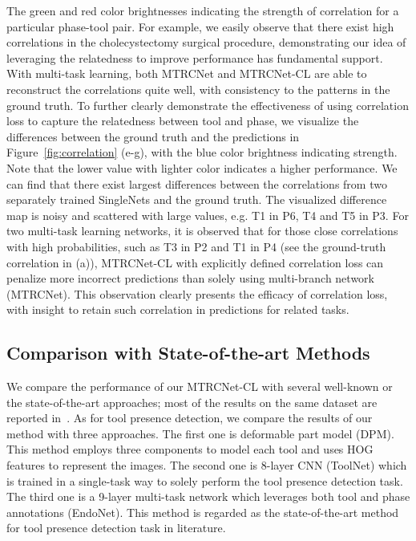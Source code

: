 \documentclass{elsarticle}
\begin{document}
The green and red color brightnesses indicating the strength of correlation for a particular phase-tool pair.
For example, we easily observe that there exist high correlations in the cholecystectomy surgical procedure, demonstrating our idea of leveraging the relatedness to improve performance has fundamental support.
With multi-task learning, both MTRCNet and MTRCNet-CL are able to reconstruct the correlations quite well, with consistency to the patterns in the ground truth.
To further clearly demonstrate the effectiveness of using correlation loss to capture the relatedness between tool and phase,
we visualize the differences between the ground truth and the predictions in Figure~\ref{fig:correlation} (e-g), with the blue color brightness indicating strength.
Note that the lower value with lighter color indicates a higher performance.
We can find that there exist largest differences between the correlations from two separately trained SingleNets and the ground truth.
The visualized difference map is noisy and scattered with large values, e.g. T1 in P6, T4 and T5 in P3.
For two multi-task learning networks, it is observed that for those close correlations with high probabilities, such as T3 in P2 and T1 in P4 (see the ground-truth correlation in (a)), MTRCNet-CL with explicitly defined correlation loss can penalize more incorrect predictions than solely using multi-branch network (MTRCNet).
This observation clearly presents the efficacy of correlation loss, with insight to retain such correlation in predictions for related tasks.



\subsection{Comparison with State-of-the-art Methods}

We compare the performance of our MTRCNet-CL with several well-known or the state-of-the-art approaches; most of the results on the same dataset are reported in~\cite{twinanda2017endonet}.
As for tool presence detection, we compare the results of our method with three approaches.
The first one is deformable part model (DPM). This method employs three components to model each tool and uses HOG features to represent the images.
The second one is 8-layer CNN (ToolNet) which is trained in a single-task way to solely perform the tool presence detection task.
The third one is a 9-layer multi-task network which leverages both tool and phase annotations (EndoNet).
This method is regarded as the state-of-the-art method for tool presence detection task in literature.
\end{document}
